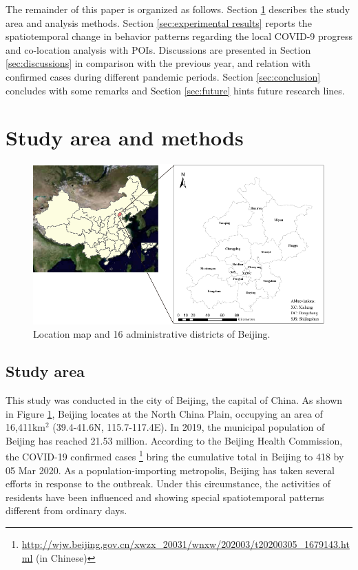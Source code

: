 \documentclass[ijgi,submit,moreauthors,pdftex]{Definitions/mdpi}
\begin{document}
The remainder of this paper is organized as follows. 
Section \ref{sec:method} describes the study area and analysis methods.
Section \ref{sec:experimental results} reports the spatiotemporal change in behavior patterns regarding the local COVID-9 progress and co-location analysis with POIs.
Discussions are presented in Section \ref{sec:discussions} in comparison with the previous year, and relation with confirmed cases during different pandemic periods.
Section \ref{sec:conclusion} concludes with some remarks and Section \ref{sec:future} hints future research lines.


\section{Study area and methods}\label{sec:method}

\begin{figure}[ht]
    \centering
    \includegraphics[width=\textwidth]{Figures/StudyArea.pdf}
    \caption{Location map and 16 administrative districts of Beijing.}
    \label{fig:study_area}
\end{figure}

\subsection{Study area}
This study was conducted in the city of Beijing, the capital of China.
As shown in Figure \ref{fig:study_area}, Beijing locates at the North China Plain, occupying an area of 16,411km$^2$ (39.4{\degree}-41.6{\degree}N, 115.7{\degree}-117.4{\degree}E).
In 2019, the municipal population of Beijing has reached 21.53 million. According to the Beijing Health Commission, the COVID-19 confirmed cases \footnote{\url{http://wjw.beijing.gov.cn/xwzx_20031/wnxw/202003/t20200305_1679143.html} (in Chinese)} bring the cumulative total in Beijing to 418 by 05 Mar 2020.
As a population-importing metropolis, Beijing has taken several efforts in response to the outbreak. 
Under this circumstance, the activities of residents have been influenced and showing special spatiotemporal patterns different from ordinary days.
\end{document}
